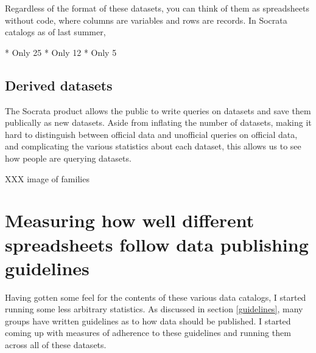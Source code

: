 \documentclass{acm_proc_article-sp}
\begin{document}

Regardless of the format of these datasets, you can think of them as
spreadsheets without code, where columns are variables and rows are records.
In Socrata catalogs as of last summer,

* Only 25%
* Only 12%
* Only 5%



\subsection{Derived datasets}
The Socrata product allows the public to write queries on datasets and
save them publically as new datasets. Aside from inflating the number
of datasets, making it hard to distinguish between official data and
unofficial queries on official data, and complicating the various
statistics about each dataset, this allows us to see how people are
querying datasets.


XXX image of families




\section{Measuring how well different spreadsheets follow data publishing guidelines}
Having gotten some feel for the contents of these various data catalogs,
I started running some less arbitrary statistics.
As discussed in section \ref{guidelines}, many groups have written guidelines
as to how data should be published.
\cite{open-data-census,fivestars,sunlight,sebastopol,odi}
I started coming up with measures of adherence to these guidelines and running
them across all of these datasets.
\end{document}

